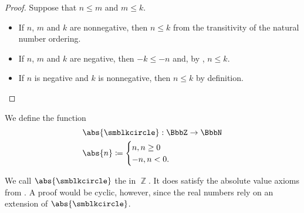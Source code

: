 \begin{proof}
   Suppose that \( n \leq m \) and \( m \leq k \).
  \begin{itemize}
    \item If \( n \), \( m \) and \( k \) are nonnegative, then \( n \leq k \) from the transitivity of the natural number ordering.
    \item If \( n \), \( m \) and \( k \) are negative, then \( -k \leq -n \) and, by , \( n \leq k \).
    \item If \( n \) is negative and \( k \) is nonnegative, then \( n \leq k \) by definition.
  \end{itemize}
\end{proof}

\begin{definition}\label{def:integer_absolute_value}
  We define the function
  \begin{equation*}
    \begin{aligned}
      &\abs{\anon}: \BbbZ \to \BbbN \\
      &\abs{n} \coloneqq \begin{cases}
        n,  n \geq 0 \\
        -n, n < 0.
      \end{cases}
    \end{aligned}
  \end{equation*}

  We call \( \abs{\anon} \) the  in \( \BbbZ \). It does satisfy the absolute value axioms from . A proof would be cyclic, however, since the real numbers rely on an extension of \( \abs{\anon} \).
\end{definition}

